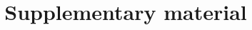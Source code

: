 \documentclass[11pt]{article}
\title{Supplementary material\\[6pt]
\large \papertitle}
\author{\paperauthor}
\date{\paperdate}
\begin{document}
\maketitle
\supplementnumbering

\end{document}
